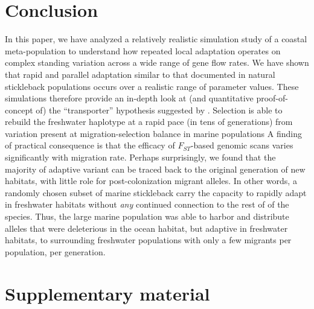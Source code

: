 \documentclass{article}
\begin{document}
\section*{Conclusion}

In this paper, we have analyzed a relatively realistic simulation study of a coastal meta-population to 
understand how repeated local adaptation operates on complex standing variation across a wide range of gene flow rates.
We have shown that rapid and parallel adaptation similar to that documented in natural stickleback populations
occurs over a realistic range of parameter values.
These simulations therefore provide an in-depth look at (and quantitative proof-of-concept of)
the ``transporter'' hypothesis suggested by \citet{schluter2009genetics}.
Selection is able to rebuild the freshwater haplotype at a rapid pace (in tens of generations) from variation present at migration-selection balance in marine populations 
A finding of practical consequence is that the efficacy of $F_{ST}$-based genomic scans varies significantly with migration rate.
Perhaps surprisingly, we found that the majority of adaptive variant can be traced back to the original generation of new habitats,
with little role for post-colonization migrant alleles. 
In other words, a randomly chosen subset of marine stickleback carry the capacity to rapidly adapt in freshwater habitats without \emph{any} continued connection to the rest of of the species.
Thus, the large marine population was able to harbor and distribute alleles that were deleterious in the ocean habitat, but adaptive in freshwater habitats, to surrounding freshwater populations with only a few migrants per population, per generation. 



{}

\clearpage
\appendix
\setcounter{table}{0}
\renewcommand{\thetable}{S\arabic{table}}
\setcounter{figure}{0}
\renewcommand{\thefigure}{S\arabic{figure}}

\section*{Supplementary material}
\end{document}

